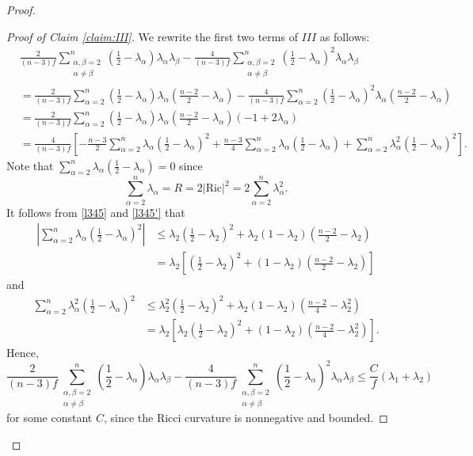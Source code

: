 \documentclass[a4, 12pt]{amsart}
\theoremstyle{plain}
\begin{document}
\begin{proof}
	\begin{proof}[Proof of Claim \ref{claim:III}]
		We rewrite the first two terms of $III$ as follows:
		\begin{align*}
			&\frac{2}{(n-3)f}\sum_{\substack{\alpha,\beta=2 \\ \alpha\neq\beta}}^n\left(\frac{1}{2} - \lambda_{\alpha}\right)\lambda_\alpha\lambda_\beta
			- \frac{4}{(n-3)f}\sum_{\substack{\alpha,\beta=2 \\ \alpha\neq\beta}}^n\left(\frac{1}{2} - \lambda_{\alpha}\right)^2\lambda_\alpha\lambda_\beta \\
			&= \frac{2}{(n-3)f}\sum_{\alpha=2}^n\left(\frac{1}{2} - \lambda_{\alpha}\right)\lambda_\alpha\left(\frac{n-2}{2} - \lambda_\alpha\right)
			- \frac{4}{(n-3)f}\sum_{\alpha=2}^n\left(\frac{1}{2} - \lambda_{\alpha}\right)^2\lambda_\alpha\left(\frac{n-2}{2} - \lambda_\alpha\right) \\
			&= \frac{2}{(n-3)f}\sum_{\alpha=2}^n\left(\frac{1}{2} - \lambda_{\alpha}\right)\lambda_\alpha\left(\frac{n-2}{2} - \lambda_\alpha\right)(-1 + 2\lambda_{\alpha}) \\
			&= \frac{4}{(n-3)f}\left[-\frac{n-3}{2}\sum_{\alpha=2}^n\lambda_\alpha\left(\frac{1}{2} - \lambda_{\alpha}\right)^2 + \frac{n-3}{4}\sum_{\alpha=2}^n\lambda_\alpha\left(\frac{1}{2} - \lambda_{\alpha}\right) + \sum_{\alpha=2}^n\lambda_\alpha^2\left(\frac{1}{2} - \lambda_{\alpha}\right)^2\right].
		\end{align*}
		Note that $\sum_{\alpha=2}^n\lambda_\alpha\left(\frac{1}{2} - \lambda_{\alpha}\right) = 0$ since
		\[
		\sum_{\alpha=2}^n\lambda_\alpha = R = 2|\mathrm{Ric}|^2 = 2\sum_{\alpha=2}^n\lambda_\alpha^2.
		\]
		It follows from \eqref{l345} and \eqref{l345'} that
		\begin{align*}
			\left|\sum_{\alpha=2}^n\lambda_\alpha\left(\frac{1}{2} - \lambda_{\alpha}\right)^2\right|
			&\leq \lambda_2\left(\frac{1}{2} - \lambda_2\right)^2 + \lambda_2(1-\lambda_2)\left(\frac{n-2}{2} - \lambda_2\right) \\
			&= \lambda_2\left[\left(\frac{1}{2} - \lambda_2\right)^2 + (1-\lambda_2)\left(\frac{n-2}{2} - \lambda_2\right)\right]
		\end{align*}
		and
		\begin{align*}
			\sum_{\alpha=2}^n\lambda_\alpha^2\left(\frac{1}{2} - \lambda_{\alpha}\right)^2
			&\leq \lambda_2^2\left(\frac{1}{2} - \lambda_2\right)^2 + \lambda_2(1-\lambda_2)\left(\frac{n-2}{4} - \lambda_2^2\right) \\
			&= \lambda_2\left[\lambda_2\left(\frac{1}{2} - \lambda_2\right)^2 + (1-\lambda_2)\left(\frac{n-2}{4} - \lambda_2^2\right)\right].
		\end{align*}
		Hence,
		\[
		\frac{2}{(n-3)f}\sum_{\substack{\alpha,\beta=2 \\ \alpha\neq\beta}}^n\left(\frac{1}{2} - \lambda_{\alpha}\right)\lambda_\alpha\lambda_\beta
		- \frac{4}{(n-3)f}\sum_{\substack{\alpha,\beta=2 \\ \alpha\neq\beta}}^n\left(\frac{1}{2} - \lambda_{\alpha}\right)^2\lambda_\alpha\lambda_\beta
		\leq \frac{C}{f}(\lambda_{1}+\lambda_{2})
		\]
		for some constant $C$, since the Ricci curvature is nonnegative and bounded.
		

\end{proof}
\end{proof}
\end{document}

